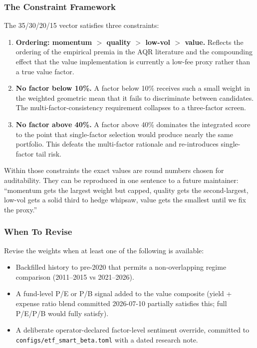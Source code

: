\documentclass[11pt,a4paper]{article}
\begin{document}
\subsubsection{The Constraint Framework}

The 35/30/20/15 vector satisfies three constraints:

\begin{enumerate}[noitemsep]
    \item \textbf{Ordering: momentum $>$ quality $>$ low-vol $>$ value.} Reflects the ordering of the empirical premia in the AQR literature and the compounding effect that the value implementation is currently a low-fee proxy rather than a true value factor.
    \item \textbf{No factor below 10\%.} A factor below 10\% receives such a small weight in the weighted geometric mean that it fails to discriminate between candidates. The multi-factor-consistency requirement collapses to a three-factor screen.
    \item \textbf{No factor above 40\%.} A factor above 40\% dominates the integrated score to the point that single-factor selection would produce nearly the same portfolio. This defeats the multi-factor rationale and re-introduces single-factor tail risk.
\end{enumerate}

Within those constraints the exact values are round numbers chosen for auditability. They can be reproduced in one sentence to a future maintainer: ``momentum gets the largest weight but capped, quality gets the second-largest, low-vol gets a solid third to hedge whipsaw, value gets the smallest until we fix the proxy.''

\subsubsection{When To Revise}

Revise the weights when at least one of the following is available:

\begin{itemize}[noitemsep]
    \item Backfilled history to pre-2020 that permits a non-overlapping regime comparison (2011--2015 vs 2021--2026).
    \item A fund-level P/E or P/B signal added to the value composite (yield + expense ratio blend committed 2026-07-10 partially satisfies this; full P/E/P/B would fully satisfy).
    \item A deliberate operator-declared factor-level sentiment override, committed to \texttt{configs/etf\_smart\_beta.toml} with a dated research note.
\end{itemize}
\end{document}

